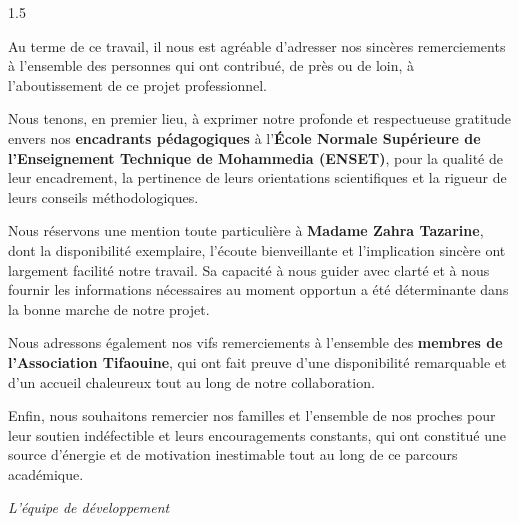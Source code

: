 \documentclass[12pt,a4paper,twoside,openright]{report}
\begin{document}
\begin{spacing}{1.5}
\begin{minipage}{0.9\textwidth}

Au terme de ce travail, il nous est agréable d'adresser nos sincères remerciements à l'ensemble des personnes qui ont contribué, de près ou de loin, à l'aboutissement de ce projet professionnel.

\vspace{0.5cm}
Nous tenons, en premier lieu, à exprimer notre profonde et respectueuse gratitude envers nos \textbf{encadrants pédagogiques} à l'\textbf{École Normale Supérieure de l'Enseignement Technique de Mohammedia (ENSET)}, pour la qualité de leur encadrement, la pertinence de leurs orientations scientifiques et la rigueur de leurs conseils méthodologiques. 

\vspace{0.5cm}
Nous réservons une mention toute particulière à \textbf{Madame Zahra Tazarine}, dont la disponibilité exemplaire, l'écoute bienveillante et l'implication sincère ont largement facilité notre travail. Sa capacité à nous guider avec clarté et à nous fournir les informations nécessaires au moment opportun a été déterminante dans la bonne marche de notre projet. 

\vspace{0.5cm}
Nous adressons également nos vifs remerciements à l'ensemble des \textbf{membres de l'Association Tifaouine}, qui ont fait preuve d'une disponibilité remarquable et d'un accueil chaleureux tout au long de notre collaboration. 

\vspace{0.5cm}
Enfin, nous souhaitons remercier nos familles et l'ensemble de nos proches pour leur soutien indéfectible et leurs encouragements constants, qui ont constitué une source d'énergie et de motivation inestimable tout au long de ce parcours académique.
\vspace{0.5cm}
\begin{flushright}
\textit{\textcolor{mediumGray}{L'équipe de développement}}
\end{flushright}

\end{minipage}
\end{spacing}

\newpage
\thispagestyle{empty}
\mbox{}

\end{document}
